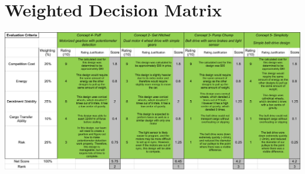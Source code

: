 \documentclass[class=../../report, crop=false]{standalone}
\begin{document}
\section{Weighted Decision Matrix} \label{app:wdm}
\mbox{} \begin{center}
	\begin{sideways}
		\begin{minipage}{1.25\textwidth}
			\includegraphics[width=\textwidth]{../../res/img/wdmregular}
			\label{app/table:wdm}
		\end{minipage}
	\end{sideways}
\end{center}

	
\end{document}
